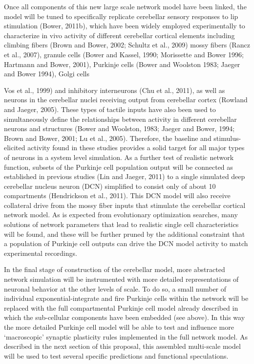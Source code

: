 \documentclass[12pt]{article}
\begin{document}
Once all components of this new large scale network model have been linked, the model will be tuned to specifically replicate cerebellar sensory responses to lip stimulation (Bower, 2011b), which have been widely employed experimentally to characterize in vivo activity of different cerebellar cortical elements including climbing fibers (Brown and Bower, 2002; Schultz et al., 2009) mossy fibers (Rancz et al., 2007), granule cells (Bower and Kassel, 1990; Morissette and Bower 1996; Hartmann and Bower, 2001), Purkinje cells (Bower and Woolston 1983; Jaeger and Bower 1994), Golgi cells {Vos et al., 1999) and inhibitory interneurons (Chu et al., 2011), as well as neurons in the cerebellar nuclei receiving output from cerebellar cortex (Rowland and Jaeger, 2005). These types of tactile inputs have also been used to simultaneously define the relationships between activity in different cerebellar neurons and structures (Bower and Woolston, 1983; Jaeger and Bower, 1994; Brown and Bower, 2001; Lu et al., 2005). Therefore, the baseline and stimulus-elicited activity found in these studies provides a solid target for all major types of neurons in a system level simulation. As a further test of realistic network function, subsets of the Purkinje cell population output will be connected as established in previous studies (Lin and Jaeger, 2011) to a single simulated deep cerebellar nucleus neuron (DCN) simplified to consist only of about 10 compartments (Hendrickson et al., 2011). This DCN model will also receive collateral drive from the mossy fiber inputs that stimulate the cerebellar cortical network model. As is expected from evolutionary optimization searches, many solutions of network parameters that lead to realistic single cell characteristics will be found, and these will be further pruned by the additional constraint that a population of Purkinje cell outputs can drive the DCN model activity to match experimental recordings.

In the final stage of construction of the cerebellar model, more abstracted network simulation will be instrumented with more detailed representations of neuronal behavior at the other levels of scale. To do so, a small number of individual exponential-integrate and fire Purkinje cells within the network will be replaced with the full compartmental Purkinje cell model already described in which the sub-cellular components have been embedded (see above). In this way the more detailed Purkinje cell model will be able to test and influence more `macroscopic' synaptic plasticity rules implemented in the full network model. As described in the next section of this proposal, this assembled multi-scale model will be used to test several specific predictions and functional speculations.

}
\end{document}
